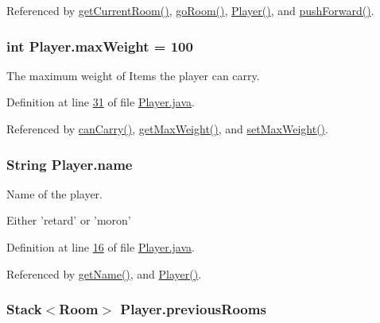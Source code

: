 Referenced by \hyperlink{Player_8java_source_l00089}{get\-Current\-Room()}, \hyperlink{Player_8java_source_l00097}{go\-Room()}, \hyperlink{Player_8java_source_l00053}{Player()}, and \hyperlink{Player_8java_source_l00120}{push\-Forward()}.

\hypertarget{classPlayer_ad1f36de0de5e6258b92ea5b8eda28edc}{
\subsubsection[{max\-Weight}]{\setlength{\rightskip}{0pt plus 5cm}int Player.\-max\-Weight = 100\hspace{0.3cm}{\ttfamily [private]}}}\label{classPlayer_ad1f36de0de5e6258b92ea5b8eda28edc}


The maximum weight of Items the player can carry. 



Definition at line \hyperlink{Player_8java_source_l00031}{31} of file \hyperlink{Player_8java_source}{Player.\-java}.



Referenced by \hyperlink{Player_8java_source_l00178}{can\-Carry()}, \hyperlink{Player_8java_source_l00073}{get\-Max\-Weight()}, and \hyperlink{Player_8java_source_l00081}{set\-Max\-Weight()}.

\hypertarget{classPlayer_aa70e75b3cc209ea82a17c469de0f159c}{
\subsubsection[{name}]{\setlength{\rightskip}{0pt plus 5cm}String Player.\-name\hspace{0.3cm}{\ttfamily [private]}}}\label{classPlayer_aa70e75b3cc209ea82a17c469de0f159c}


Name of the player. 

Either 'retard' or 'moron' 

Definition at line \hyperlink{Player_8java_source_l00016}{16} of file \hyperlink{Player_8java_source}{Player.\-java}.



Referenced by \hyperlink{Player_8java_source_l00065}{get\-Name()}, and \hyperlink{Player_8java_source_l00053}{Player()}.

\hypertarget{classPlayer_af1db286d50de195af75c9c82375fade9}{
\subsubsection[{previous\-Rooms}]{\setlength{\rightskip}{0pt plus 5cm}Stack$<${\bf Room}$>$ Player.\-previous\-Rooms\hspace{0.3cm}{\ttfamily [private]}}}\label{classPlayer_af1db286d50de195af75c9c82375fade9}


